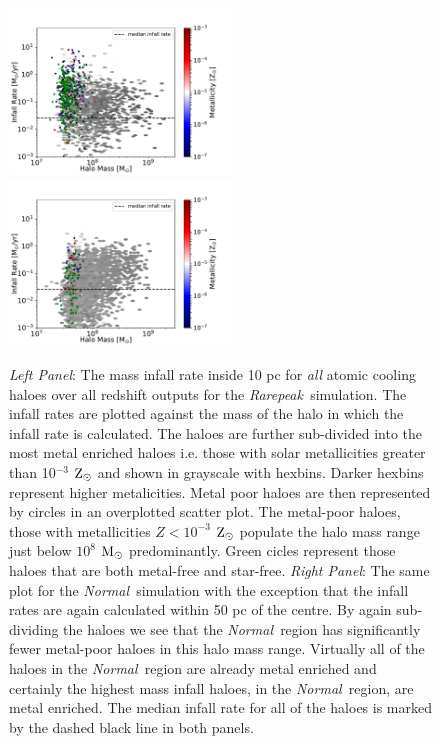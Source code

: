 \documentclass[graphics, twocolumn, usenatbib]{mn2e}
\newcommand{\msolar} {$\rm{M_{\odot}}~$}
\newcommand{\zsolar} {$\rm{Z_{\odot}}~$}
\newcommand{\rarepeak} {\textit{Rarepeak~}}
\newcommand{\normal} {\textit{Normal~}}
\begin{document}
\begin{figure}
\centering
\begin{minipage}{175mm}      \begin{center} 
\centerline{
\includegraphics[width=0.525\textwidth]{FIGURES/Rarepeak_MdotMHaloZ_Hexbin.pdf}
\includegraphics[width=0.525\textwidth]{FIGURES/Normal_MdotMHaloZ_Hexbin.pdf}}
\caption{\textit{Left Panel}: The mass infall rate inside 10 pc for \textit{all} atomic
  cooling haloes over all redshift outputs for the \rarepeak simulation. The infall rates
  are plotted against the mass of the halo in which the infall rate is
  calculated. The haloes are further sub-divided into the most metal enriched haloes
  i.e. those with solar metallicities greater than 10$^{-3}$ \zsolar and shown in grayscale with
  hexbins. Darker hexbins represent higher metalicities. Metal poor haloes are then represented
  by circles in an overplotted scatter plot. The metal-poor haloes, those with metallicities
  $Z < 10^{-3}$ \zsolar populate the halo mass range just below $10^{8}$ \msolar predominantly.
  Green cicles represent those haloes that are both metal-free and star-free. 
  \textit{Right Panel}: The same plot for the \normal simulation with the exception that the infall
  rates are again calculated within 50 pc of the centre. By again sub-dividing the haloes we see
  that the \normal region has significantly fewer metal-poor haloes in this halo mass range.
  Virtually all of the haloes in the \normal region are already metal enriched and certainly the
  highest mass infall haloes, in the \normal region, are metal enriched. 
  The median infall rate for all of the haloes is marked by the dashed black line in both panels.}
\label{Fig:HaloMass}
\end{center} \end{minipage}

\end{figure}
\end{document}
